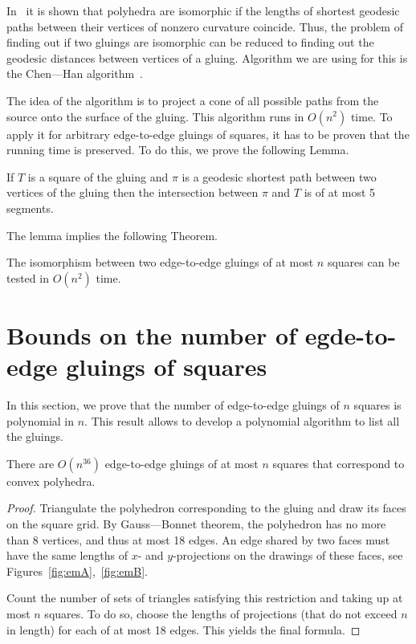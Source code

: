 \documentclass[a4paper,USenglish,cleveref, autoref, thm-restate]{socg-lipics-v2019}
\begin{document}
In~\cite{DO07} it is shown that polyhedra are isomorphic if the lengths of shortest geodesic paths between their vertices of nonzero curvature coincide. Thus, the problem of finding out if two gluings are isomorphic can be reduced to finding out the geodesic distances between vertices of a gluing. Algorithm we are using for this is the Chen—Han algorithm~\cite{chen-han}.

The idea of the algorithm is to project a cone of all possible paths from the source onto the surface of the gluing. This algorithm runs in $O(n^2)$ time. To apply it for arbitrary edge-to-edge gluings of squares, it has to be proven that the running time is preserved. To do this, we prove the following Lemma.

\begin{lemma} \label{lm:shortestSquare}
	If $T$ is a square of the gluing and $\pi$ is a geodesic shortest path between two vertices of the gluing then the intersection between $\pi$ and $T$ is of at most 5 segments.
\end{lemma}

The lemma implies the following Theorem.

\begin{theorem} \label{thm:chruntime}
	The isomorphism between two edge-to-edge gluings of at most $n$ squares can be tested in $O(n^2)$ time.
\end{theorem}

\section{Bounds on the number of egde-to-edge gluings of squares}

In this section, we prove that the number of edge-to-edge gluings of $n$ squares is polynomial in $n$. This result allows to develop a polynomial algorithm to list all the gluings.

\begin{theorem} \label{thm:n36}
	There are $O \left( n^{36} \right)$ edge-to-edge gluings of at most $n$ squares that correspond to convex polyhedra.
\end{theorem}

\begin{proof}
	Triangulate the polyhedron corresponding to the gluing and draw its faces on the square grid. By Gauss—Bonnet theorem, the polyhedron has no more than 8 vertices, and thus at most 18 edges. An edge shared by two faces must have the same lengths of $x$- and $y$-projections on the drawings of these faces, see Figures~\ref{fig:emA},~\ref{fig:emB}.

	Count the number of sets of triangles satisfying this restriction and taking up at most $n$ squares. To do so, choose the lengths of projections (that do not exceed $n$ in length) for each of at most 18 edges. This yields the final formula.
\end{proof}
\end{document}
